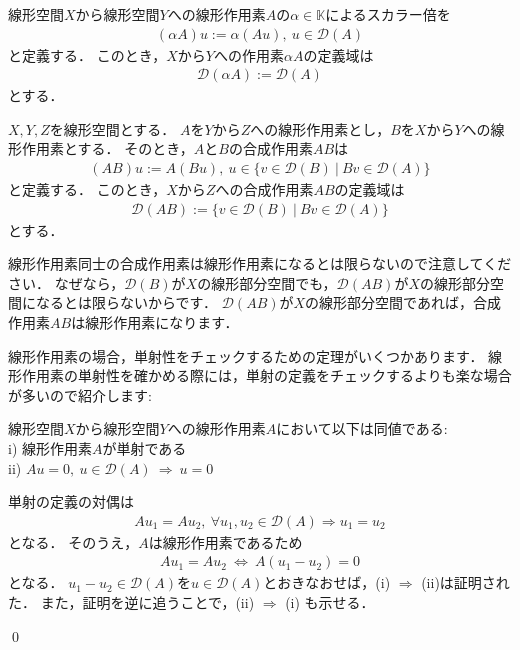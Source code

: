 \begin{defi}[線形作用素のスカラー乗法]\label{def:scalar_operator}
	線形空間$X$から線形空間$Y$への線形作用素$A$の$\alpha \in {\mathbb K}$によるスカラー倍を
	\begin{align*}
	(\alpha A) u := \alpha (Au), ~ u \in {\mathcal D}(A)
	\end{align*}
	と定義する．
	このとき，$X$から$Y$への作用素$\alpha A$の定義域は
	\begin{align*}
	{\mathcal D}(\alpha A) :=  {\mathcal D}(A)
	\end{align*}
	とする．
\end{defi}


\begin{defi}[合成作用素]\label{def:mul_operator}
	$X,Y,Z$を線形空間とする．
	$A$を$Y$から$Z$への線形作用素とし，$B$を$X$から$Y$への線形作用素とする．
	そのとき，$A$と$B$の合成作用素$AB$は
	\begin{align*}
	(A B) u := A( B u), ~ u \in \{ v \in {\mathcal D}(B) ~ | ~ Bv \in {\mathcal D}(A)  \}
	\end{align*}
	と定義する．
	このとき，$X$から$Z$への合成作用素$AB$の定義域は
	\begin{align*}
	{\mathcal D}(AB) := \{ v \in  {\mathcal D}(B) ~ | ~ Bv \in {\mathcal D}(A)  \}
	\end{align*}
	とする．
\end{defi}

線形作用素同士の合成作用素は線形作用素になるとは限らないので注意してください．
なぜなら，${\mathcal D}(B)$が$X$の線形部分空間でも，${\mathcal D}(AB)$が$X$の線形部分空間になるとは限らないからです．
${\mathcal D}(AB)$が$X$の線形部分空間であれば，合成作用素$AB$は線形作用素になります．


線形作用素の場合，単射性をチェックするための定理がいくつかあります．
線形作用素の単射性を確かめる際には，単射の定義をチェックするよりも楽な場合が多いので紹介します:

\begin{Thm}[線形作用素に対する単射性(1)]\label{thm:linear_operator_injective11}
	線形空間$X$から線形空間$Y$への線形作用素$A$において以下は同値である:\\
	i) 線形作用素$A$が単射である \\
	ii) $A u = 0, ~ u \in {\mathcal D}(A)  ~ \Rightarrow ~ u = 0$
\end{Thm}

\begin{Proof}
	単射の定義の対偶は
	\begin{align*}
	A u_1  = A u_2 , ~ \forall u_1, u_2 \in {\mathcal D}(A) \Rightarrow  u_1 = u_2
	\end{align*}
	となる．
	そのうえ，$A$は線形作用素であるため
	\begin{align*}
	A u_1  = A u_2 ~ \Leftrightarrow ~ A (u_1 - u_2) = 0
	\end{align*}
	となる．
	$u_1 - u_2 \in {\mathcal D}(A)$を$u \in {\mathcal D}(A)$とおきなおせば，(i) $\Rightarrow$ (ii)は証明された．
	また，証明を逆に追うことで，(ii) $\Rightarrow$ (i) も示せる．

\qed
\end{Proof}

